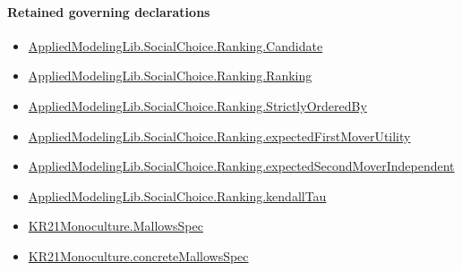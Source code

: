 \documentclass[10pt]{article}
\begin{document}
\paragraph{Retained governing declarations}
\begin{itemize}\raggedright
\item \hyperlink{library-prerequisite-8c0e6c25845ae78a}{Applied\allowbreak{}Modeling\allowbreak{}Lib.\allowbreak{}Social\allowbreak{}Choice.\allowbreak{}Ranking.\allowbreak{}Candidate}
\item \hyperlink{library-prerequisite-5cde54446d1ae021}{Applied\allowbreak{}Modeling\allowbreak{}Lib.\allowbreak{}Social\allowbreak{}Choice.\allowbreak{}Ranking.\allowbreak{}Ranking}
\item \hyperlink{library-prerequisite-3585717d1635654a}{Applied\allowbreak{}Modeling\allowbreak{}Lib.\allowbreak{}Social\allowbreak{}Choice.\allowbreak{}Ranking.\allowbreak{}Strictly\allowbreak{}Ordered\allowbreak{}By}
\item \hyperlink{governing-declaration-6c7ea05ca04bc04a}{Applied\allowbreak{}Modeling\allowbreak{}Lib.\allowbreak{}Social\allowbreak{}Choice.\allowbreak{}Ranking.\allowbreak{}expected\allowbreak{}First\allowbreak{}Mover\allowbreak{}Utility}
\item \hyperlink{governing-declaration-4f697449f42135d1}{Applied\allowbreak{}Modeling\allowbreak{}Lib.\allowbreak{}Social\allowbreak{}Choice.\allowbreak{}Ranking.\allowbreak{}expected\allowbreak{}Second\allowbreak{}Mover\allowbreak{}Independent}
\item \hyperlink{governing-declaration-127efd44d176e2ba}{Applied\allowbreak{}Modeling\allowbreak{}Lib.\allowbreak{}Social\allowbreak{}Choice.\allowbreak{}Ranking.\allowbreak{}kendall\allowbreak{}Tau}
\item \hyperlink{governing-declaration-b2e6ec0602659b07}{KR21\allowbreak{}Monoculture.\allowbreak{}Mallows\allowbreak{}Spec}
\item \hyperlink{governing-declaration-0e399c7dd166853c}{KR21\allowbreak{}Monoculture.\allowbreak{}concrete\allowbreak{}Mallows\allowbreak{}Spec}
\end{itemize}
\end{document}
